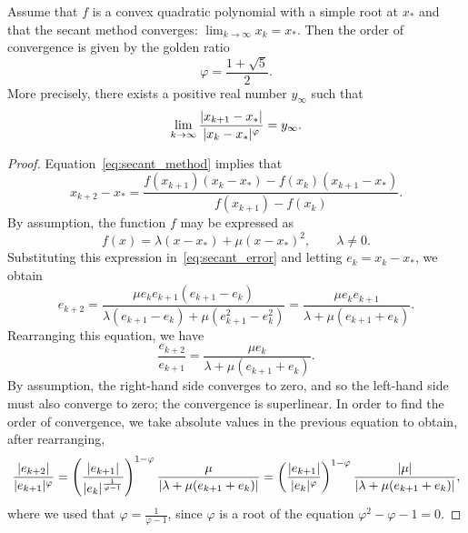 \begin{theorem}
    Assume that $f$ is a convex quadratic polynomial with a simple root at $x_*$
    and that the secant method converges: $\lim_{k\to \infty} x_k = x_*$.
    Then the order of convergence is given by the golden ratio
    \[
        \varphi = \frac{1 + \sqrt{5}}{2}.
    \]
    More precisely, there exists a positive real number $y_{\infty}$ such that
    \begin{equation}
        \label{eq:convergence_secant}
        \lim_{k \to \infty} \frac{\lvert x_{k+1} - x_*\rvert}{\lvert x_{k} - x_*\rvert^{\varphi}} = y_{\infty}.
    \end{equation}
\end{theorem}
\begin{proof}
    Equation~\eqref{eq:secant_method} implies that
    \begin{equation*}
        \label{eq:secant_error}
        x_{k+2} - x_* = \frac{f(x_{k+1}) (x_k - x_*) - f(x_k) (x_{k+1}-x_*)}{f(x_{k+1}) - f(x_k)}.
    \end{equation*}
    By assumption, the function $f$ may be expressed as
    \[
        f(x) = \lambda (x - x_*) + \mu (x - x_*)^2, \qquad \lambda \neq 0.
    \]
    Substituting this expression in~\eqref{eq:secant_error} and letting $e_k = x_k - x_*$,
    we obtain
    \[
        e_{k+2}
        = \frac{\mu e_k e_{k+1} (e_{k+1} - e_{k})}{\lambda (e_{k+1} - e_k) + \mu (e_{k+1}^2 - e_k^2)}
        = \frac{\mu e_k e_{k+1}}{\lambda + \mu (e_{k+1} + e_k)}.
    \]
    Rearranging this equation,
    we have
    \begin{equation}
        \label{eq:secant_method_rearranged}
        \frac{e_{k+2}}{e_{k+1}}
        = \frac{\mu e_k}{\lambda + \mu (e_{k+1} + e_k)}.
    \end{equation}
    By assumption, the right-hand side converges to zero,
    and so the left-hand side must also converge to zero;
    the convergence is superlinear.
    In order to find the order of convergence,
    we take absolute values in the previous equation to obtain,
    after rearranging,
    \[
        \frac{\lvert e_{k+2}\rvert}{\lvert e_{k+1}\rvert^{\varphi}}
        =  \left( \frac{\lvert e_{k+1}\rvert}{\lvert e_{k}\rvert^{\frac{1}{\varphi -1}}}  \right)^{1 - \varphi} \frac{\mu}{\lvert\lambda + \mu (e_{k+1} + e_k)\rvert}
        =  \left( \frac{\lvert e_{k+1}\rvert}{\lvert e_{k}\rvert^{\varphi}}  \right)^{1 - \varphi} \frac{\lvert\mu\rvert}{\lvert\lambda + \mu (e_{k+1} + e_k)\rvert},
    \]
    where we used that $\varphi = \frac{1}{\varphi- 1}$,
    since $\varphi$ is a root of the equation $\varphi^2 - \varphi - 1 = 0$.

\end{proof}
